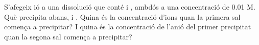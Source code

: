 \begin{exr}{}
S'afegeix ió  a una dissolució que conté  i , ambdós a una concentració de 0.01 M. Què precipita abans,  i . Quina és la concentració d'ions  quan la primera sal comença a precipitar? I quina és la concentració de l'anió del primer precipitat quan la segona sal comença a precipitar?
\end{exr}
